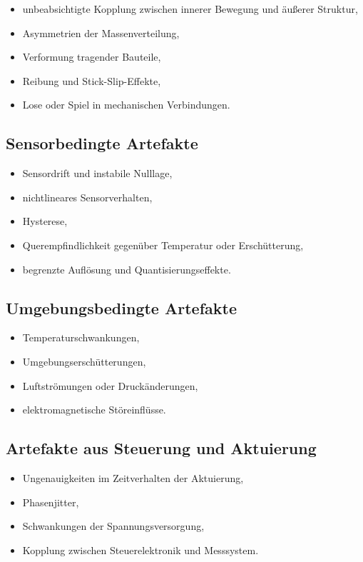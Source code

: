\documentclass[12pt,a4paper]{report}
\begin{document}
\begin{itemize}
\item unbeabsichtigte Kopplung zwischen innerer Bewegung und äußerer
      Struktur,
\item Asymmetrien der Massenverteilung,
\item Verformung tragender Bauteile,
\item Reibung und Stick-Slip-Effekte,
\item Lose oder Spiel in mechanischen Verbindungen.
\end{itemize}

\subsection{Sensorbedingte Artefakte}

\begin{itemize}
\item Sensordrift und instabile Nulllage,
\item nichtlineares Sensorverhalten,
\item Hysterese,
\item Querempfindlichkeit gegenüber Temperatur oder Erschütterung,
\item begrenzte Auflösung und Quantisierungseffekte.
\end{itemize}

\subsection{Umgebungsbedingte Artefakte}

\begin{itemize}
\item Temperaturschwankungen,
\item Umgebungserschütterungen,
\item Luftströmungen oder Druckänderungen,
\item elektromagnetische Störeinflüsse.
\end{itemize}

\subsection{Artefakte aus Steuerung und Aktuierung}

\begin{itemize}
\item Ungenauigkeiten im Zeitverhalten der Aktuierung,
\item Phasenjitter,
\item Schwankungen der Spannungsversorgung,
\item Kopplung zwischen Steuerelektronik und Messsystem.
\end{itemize}
\end{document}
